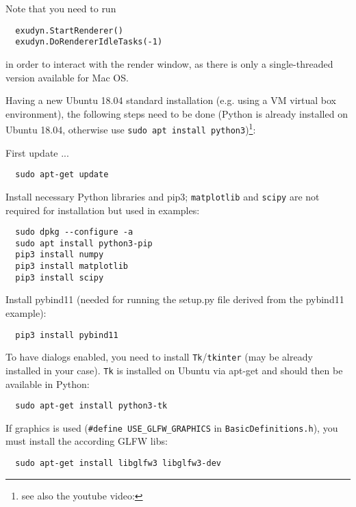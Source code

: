 \noindent Note that you need to run 
\pythonstyle\begin{lstlisting}
  exudyn.StartRenderer()
  exudyn.DoRendererIdleTasks(-1)
\end{lstlisting}
in order to interact with the render window, as there is only a single-threaded version available for Mac OS.

%
Having a new Ubuntu 18.04 standard installation (e.g. using a VM virtual box environment), the following steps need to be done (Python  is already installed on Ubuntu 18.04, otherwise use \texttt{sudo apt install python3})\footnote{see also the youtube video: }:

\noindent First update ...
\plainlststyle
\begin{lstlisting}
  sudo apt-get update
\end{lstlisting}

\noindent 
Install necessary Python libraries and pip3; \texttt{matplotlib} and \texttt{scipy} are not required for installation but used in \codeName examples:
\begin{lstlisting}
  sudo dpkg --configure -a
  sudo apt install python3-pip
  pip3 install numpy
  pip3 install matplotlib
  pip3 install scipy
\end{lstlisting}

\noindent Install pybind11 (needed for running the setup.py file derived from the pybind11 example):
\begin{lstlisting}
  pip3 install pybind11
\end{lstlisting}

\noindent To have dialogs enabled, you need to install \texttt{Tk}/\texttt{tkinter} (may be already installed in your case). 
\texttt{Tk} is installed on Ubuntu via apt-get and should then be available in Python:
\begin{lstlisting}
  sudo apt-get install python3-tk
\end{lstlisting}

\noindent 
If graphics is used (\texttt{\#define USE\_GLFW\_GRAPHICS} in \texttt{BasicDefinitions.h}), you must install the according GLFW libs:
\begin{lstlisting}
  sudo apt-get install libglfw3 libglfw3-dev
\end{lstlisting}

